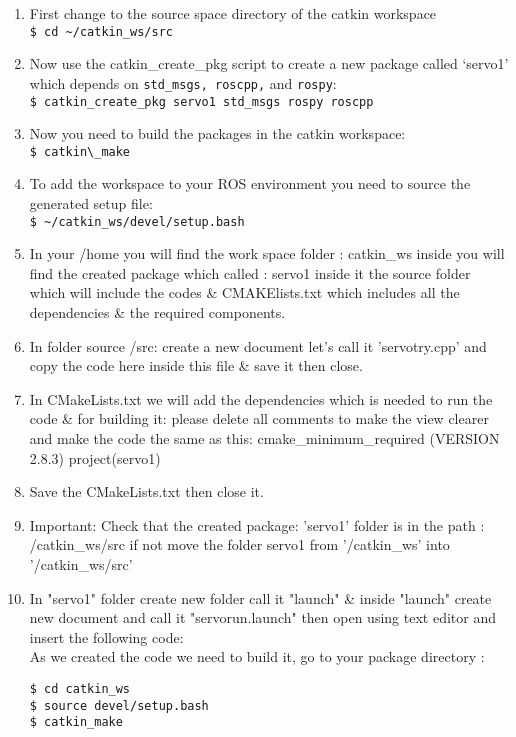  \begin{enumerate}
 	\item First change to the source space directory of the catkin workspace\\
      \lstinline|$ cd ~/catkin_ws/src|
     
     
 	\item Now use the catkin\_create\_pkg script to create a new package called ‘servo1’ which depends on \verb|std_msgs, roscpp,| and \verb|rospy|:\\
     \lstinline|$ catkin_create_pkg servo1 std_msgs rospy roscpp|
     
 	\item Now you need to build the packages in the catkin workspace:\\
    \lstinline|$ catkin\_make|
     
 	\item To add the workspace to your ROS environment you need to source the generated setup file:\\
         \lstinline|$ ~/catkin_ws/devel/setup.bash|
         
 	\item In your /home you will find the work space folder : catkin\_ws inside you will find the created package which called : servo1 inside it the source folder which will include the codes \& CMAKElists.txt which includes all the dependencies \& the required components.
     
 	\item In folder source /src: create a new document let's call it 'servotry.cpp' and copy the code here inside this file \& save it then close.
     
 	\item In CMakeLists.txt we will add the dependencies which is needed to run the code \& for building it: please delete all comments to make the view clearer and make the code the same as this: cmake\_minimum\_required (VERSION 2.8.3) project(servo1)
 	
     \item Save the CMakeLists.txt then close it.
 	
     \item Important: Check that the created package: 'servo1' folder is in the path : /catkin\_ws/src
 	if not move the folder servo1 from '/catkin\_ws' into '/catkin\_ws/src'
 	
     \item In "servo1" folder create new folder call it "launch" \& inside "launch" create new document and call it "servorun.launch" then open using text editor and insert the following code:\\
 	As we created the code we need to build it, go to your package directory : 
     \begin{lstlisting}[language=terCmd]
$ cd catkin_ws
$ source devel/setup.bash
$ catkin_make
     \end{lstlisting}


\end{enumerate}
